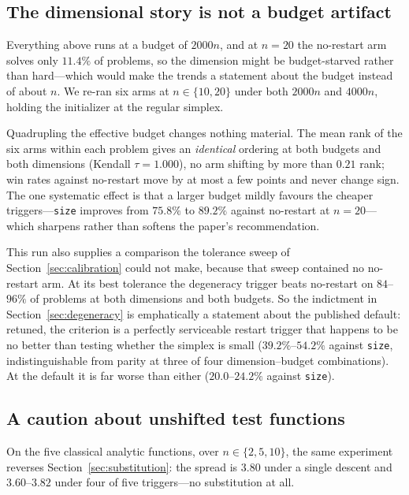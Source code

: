 \documentclass[11pt,a4paper]{article}
\begin{document}
\subsection{The dimensional story is not a budget artifact}
\label{sec:budget}

Everything above runs at a budget of $2000n$, and at $n=20$ the no-restart arm
solves only $11.4\%$ of problems, so the dimension might be budget-starved rather
than hard---which would make the trends a statement about the budget instead of
about $n$. We re-ran six arms at $n\in\{10,20\}$ under both $2000n$ and $4000n$,
holding the initializer at the regular simplex.

Quadrupling the effective budget changes nothing material. The mean rank of the
six arms within each problem gives an \emph{identical} ordering at both budgets
and both dimensions (Kendall $\tau = 1.000$), no arm shifting by more than $0.21$
rank; win rates against no-restart move by at most a few points and never change
sign. The one systematic effect is that a larger budget mildly favours the
cheaper triggers---\texttt{size} improves from $75.8\%$ to $89.2\%$ against
no-restart at $n=20$---which sharpens rather than softens the paper's
recommendation.

This run also supplies a comparison the tolerance sweep of
Section~\ref{sec:calibration} could not make, because that sweep contained no
no-restart arm. At its best tolerance the degeneracy trigger beats no-restart on
$84$--$96\%$ of problems at both dimensions and both budgets. So the indictment
in Section~\ref{sec:degeneracy} is emphatically a statement about the published
default: retuned, the criterion is a perfectly serviceable restart trigger that
happens to be no better than testing whether the simplex is small
($39.2\%$--$54.2\%$ against \texttt{size}, indistinguishable from parity at three
of four dimension--budget combinations). At the default it is far worse than
either ($20.0$--$24.2\%$ against \texttt{size}).

\subsection{A caution about unshifted test functions}
\label{sec:caution}

On the five classical analytic functions, over $n\in\{2,5,10\}$, the same
experiment reverses Section~\ref{sec:substitution}: the spread is $3.80$ under a single descent and
$3.60$--$3.82$ under four of five triggers---no substitution at all.
\end{document}
